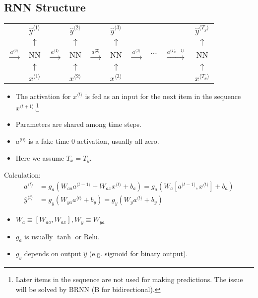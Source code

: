 \subsection{RNN Structure}
\begin{center}
  \begin{tabular}{cccccccccc}
    & $\hat{y}^{\langle 1\rangle}$ & & $\hat{y}^{\langle 2\rangle}$ & & $\hat{y}^{\langle 3\rangle}$ & & & & $\hat{y}^{\langle T_y\rangle}$\\
    & $\uparrow$ & & $\uparrow$ & & $\uparrow$ & & & & $\uparrow$\\ 
    $\xrightarrow{a^{\langle 0\rangle}}$& NN & $\xrightarrow{a^{\langle 1\rangle}}$ & NN & $\xrightarrow{a^{\langle 2\rangle}}$ & NN & $\xrightarrow{a^{\langle 3\rangle}}$ & $\cdots$ & $\xrightarrow{a^{\langle T_x-1\rangle}}$ & NN \\ 
    & $\uparrow$ & & $\uparrow$ & & $\uparrow$ & & & & $\uparrow$\\ 
    & $x^{\langle 1\rangle}$ & & $x^{\langle 2\rangle}$ & & $x^{\langle 3\rangle}$ & & & & $x^{\langle T_x\rangle}$\\
  \end{tabular}
\end{center}
\begin{itemize}
  \item The activation for $x^{\langle t\rangle}$ is fed as an input for the next item in the sequence $x^{\langle t+1\rangle}$.\footnote{Later items in the sequence are not used for making predictions. The issue will be solved by BRNN (B for bidirectional).}
  \item Parameters are shared among time steps.
  \item $a^{\langle 0\rangle}$ is a fake time 0 activation, usually all zero.
  \item Here we assume $T_x=T_y$. 
  \end{itemize}
Calculation:
\begin{align*}
a^{\langle t\rangle}&=g_a\left(W_{aa}a^{\langle t-1\rangle}+W_{ax}x^{\langle t\rangle}+b_a\right)=g_a\left(W_{a}\left[a^{\langle t-1\rangle}, x^{\langle t\rangle}\right]+b_a\right)\\
\hat{y}^{\langle t\rangle}&=g_y\left(W_{ya}a^{\langle t\rangle}+b_y\right)=g_y\left(W_{y}a^{\langle t\rangle}+b_y\right)
\end{align*}
\begin{itemize}
\item $W_a\equiv\left[W_{aa}, W_{ax}\right], W_y\equiv W_{ya}$
\item $g_a$ is usually $\tanh$ or Relu.
\item $g_y$ depends on output $\hat{y}$ (e.g. sigmoid for binary output).
\end{itemize}
